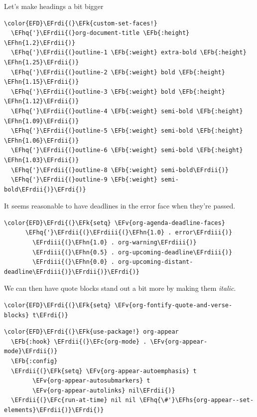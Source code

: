 \documentclass{scrartcl}
\newcommand{\EFk}[1]{\textcolor{EFk}{#1}} %
\newcommand{\EFb}[1]{\textcolor{EFb}{#1}} %
\newcommand{\EFc}[1]{\textcolor{EFc}{#1}} %
\newcommand{\EFv}[1]{\textcolor{EFv}{#1}} %
\newcommand{\EFhn}[1]{#1} %
\newcommand{\EFhq}[1]{#1} %
\newcommand{\EFhs}[1]{#1} %
\newcommand{\EFrdi}[1]{#1} %
\newcommand{\EFrdii}[1]{#1} %
\newcommand{\EFrdiii}[1]{#1} %
\begin{document}
Let's make headings a bit bigger
\begin{Code}
\begin{Verbatim}[]
\color{EFD}\EFrdi{(}\EFk{custom-set-faces!}
  \EFhq{'}\EFrdii{(}org-document-title \EFb{:height} \EFhn{1.2}\EFrdii{)}
  \EFhq{'}\EFrdii{(}outline-1 \EFb{:weight} extra-bold \EFb{:height} \EFhn{1.25}\EFrdii{)}
  \EFhq{'}\EFrdii{(}outline-2 \EFb{:weight} bold \EFb{:height} \EFhn{1.15}\EFrdii{)}
  \EFhq{'}\EFrdii{(}outline-3 \EFb{:weight} bold \EFb{:height} \EFhn{1.12}\EFrdii{)}
  \EFhq{'}\EFrdii{(}outline-4 \EFb{:weight} semi-bold \EFb{:height} \EFhn{1.09}\EFrdii{)}
  \EFhq{'}\EFrdii{(}outline-5 \EFb{:weight} semi-bold \EFb{:height} \EFhn{1.06}\EFrdii{)}
  \EFhq{'}\EFrdii{(}outline-6 \EFb{:weight} semi-bold \EFb{:height} \EFhn{1.03}\EFrdii{)}
  \EFhq{'}\EFrdii{(}outline-8 \EFb{:weight} semi-bold\EFrdii{)}
  \EFhq{'}\EFrdii{(}outline-9 \EFb{:weight} semi-bold\EFrdii{)}\EFrdi{)}
\end{Verbatim}
\end{Code}

It seems reasonable to have deadlines in the error face when they're passed.
\begin{Code}
\begin{Verbatim}[]
\color{EFD}\EFrdi{(}\EFk{setq} \EFv{org-agenda-deadline-faces}
      \EFhq{'}\EFrdii{(}\EFrdiii{(}\EFhn{1.0} . error\EFrdiii{)}
        \EFrdiii{(}\EFhn{1.0} . org-warning\EFrdiii{)}
        \EFrdiii{(}\EFhn{0.5} . org-upcoming-deadline\EFrdiii{)}
        \EFrdiii{(}\EFhn{0.0} . org-upcoming-distant-deadline\EFrdiii{)}\EFrdii{)}\EFrdi{)}
\end{Verbatim}
\end{Code}

We can then have quote blocks stand out a bit more by making them \emph{italic}.
\begin{Code}
\begin{Verbatim}[]
\color{EFD}\EFrdi{(}\EFk{setq} \EFv{org-fontify-quote-and-verse-blocks} t\EFrdi{)}
\end{Verbatim}
\end{Code}

\begin{Code}
\begin{Verbatim}[]
\color{EFD}\EFrdi{(}\EFk{use-package!} org-appear
  \EFb{:hook} \EFrdii{(}\EFc{org-mode} . \EFv{org-appear-mode}\EFrdii{)}
  \EFb{:config}
  \EFrdii{(}\EFk{setq} \EFv{org-appear-autoemphasis} t
        \EFv{org-appear-autosubmarkers} t
        \EFv{org-appear-autolinks} nil\EFrdii{)}
  \EFrdii{(}\EFc{run-at-time} nil nil \EFhq{\#'}\EFhs{org-appear--set-elements}\EFrdii{)}\EFrdi{)}
\end{Verbatim}
\end{Code}
\end{document}
